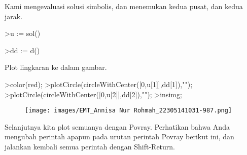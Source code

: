 \documentclass[a4paper,10pt]{article}
\begin{document}
\begin{eulernotebook}
\begin{eulercomment}
\begin{eulercomment}
\begin{eulercomment}
\begin{eulercomment}
\begin{eulercomment}
Kami mengevaluasi solusi simbolis, dan menemukan kedua pusat, dan
kedua jarak.
\end{eulercomment}
\begin{eulerprompt}
>u := sol()
\end{eulerprompt}
\begin{euleroutput}
  [0.333333,  1]
\end{euleroutput}
\begin{eulerprompt}
>dd := d()
\end{eulerprompt}
\begin{euleroutput}
  [0.149071,  0.447214]
\end{euleroutput}
\begin{eulercomment}
Plot lingkaran ke dalam gambar.
\end{eulercomment}
\begin{eulerprompt}
>color(red);
>plotCircle(circleWithCenter([0,u[1]],dd[1]),"");
>plotCircle(circleWithCenter([0,u[2]],dd[2]),"");
>insimg;
\end{eulerprompt}
\begin{figure}[h]
    \centering
    \texttt{[image: images/EMT\_Annisa Nur Rohmah\_22305141031-987.png]}
\end{figure}
\begin{eulercomment}
Selanjutnya kita plot semuanya dengan Povray. Perhatikan bahwa Anda
mengubah perintah apapun pada urutan perintah Povray berikut ini, dan
jalankan kembali semua perintah dengan Shift-Return.


\end{eulercomment}
\end{eulercomment}
\end{eulercomment}
\end{eulercomment}
\end{eulercomment}
\end{eulernotebook}
\end{document}
